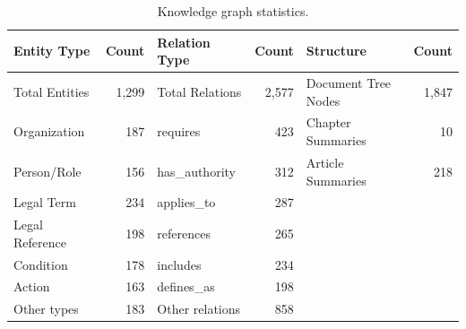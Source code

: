 \documentclass[11pt,a4paper]{article}
\begin{document}
\begin{table}[H]
\centering\small
\caption{Knowledge graph statistics.}
\label{tab:kg-stats}
\begin{tabular}{lr@{\hskip 2cm}lr@{\hskip 2cm}lr}
\toprule
\textbf{Entity Type} & \textbf{Count} & \textbf{Relation Type} & \textbf{Count} & \textbf{Structure} & \textbf{Count} \\
\midrule
Total Entities & 1,299 & Total Relations & 2,577 & Document Tree Nodes & 1,847 \\
Organization & 187 & requires & 423 & Chapter Summaries & 10 \\
Person/Role & 156 & has\_authority & 312 & Article Summaries & 218 \\
Legal Term & 234 & applies\_to & 287 & & \\
Legal Reference & 198 & references & 265 & & \\
Condition & 178 & includes & 234 & & \\
Action & 163 & defines\_as & 198 & & \\
Other types & 183 & Other relations & 858 & & \\
\bottomrule
\end{tabular}
\end{table}
\end{document}
